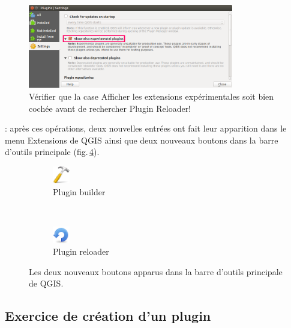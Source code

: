 \documentclass[11pt]{article}
\begin{document}
\begin{figure}[H]
	\centering
    \includegraphics[width=0.8\textwidth]{experimental_flag.png}
	\caption[Sélectionner \og{}Afficher les extensions expérimentales\fg{} pour trouver \og{}Plugin reloader\fg{}.]{Vérifier que la case \og{}Afficher les extensions expérimentales\fg{} soit bien cochée avant de rechercher \og{}Plugin Reloader\fg{}!}
    \label{experimental}
\end{figure}


\underline{}: après ces opérations, deux nouvelles entrées ont fait leur apparition dans le menu \og{}Extensions\fg{} de QGIS ainsi que deux nouveaux boutons dans la barre d'outils principale (fig.\,\ref{fig3}).


\begin{figure}[H]
    \centering
    \begin{subfigure}[t]{0.2\textwidth}
		\centering
        \includegraphics[width=2em]{pluginbuilder.png}
\caption{Plugin builder}\label{fig3:builder}
    \end{subfigure}%
    ~
    \begin{subfigure}[t]{0.2\textwidth}
        \centering
        \includegraphics[width=2em]{reload.png}
        \caption{Plugin reloader}\label{fig3:reloader}
    \end{subfigure}
    \caption{Les deux nouveaux boutons apparus dans la barre d'outils principale de QGIS.}
    \label{fig3}
\end{figure}




\subsection{Exercice de création d'un plugin}
\label{CreationPlugin}
\end{document}

